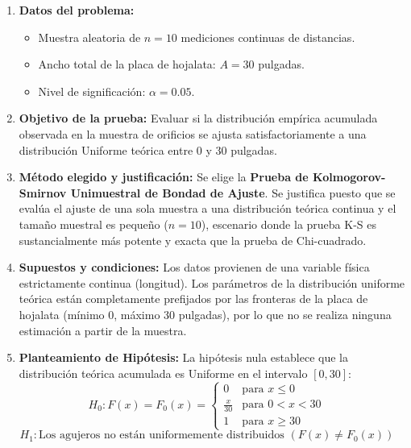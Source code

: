 \documentclass[11pt,a4paper]{article}
\begin{document}
\begin{enumerate}
    \item \textbf{Datos del problema:}
    \begin{itemize}
        \item Muestra aleatoria de $n = 10$ mediciones continuas de distancias.
        \item Ancho total de la placa de hojalata: $A = 30$ pulgadas.
        \item Nivel de significación: $\alpha = 0.05$.
    \end{itemize}

    \item \textbf{Objetivo de la prueba:}
    Evaluar si la distribución empírica acumulada observada en la muestra de orificios se ajusta satisfactoriamente a una distribución Uniforme teórica entre 0 y 30 pulgadas.

    \item \textbf{Método elegido y justificación:}
    Se elige la \textbf{Prueba de Kolmogorov-Smirnov Unimuestral de Bondad de Ajuste}. Se justifica puesto que se evalúa el ajuste de una sola muestra a una distribución teórica continua y el tamaño muestral es pequeño ($n=10$), escenario donde la prueba K-S es sustancialmente más potente y exacta que la prueba de Chi-cuadrado.

    \item \textbf{Supuestos y condiciones:}
    Los datos provienen de una variable física estrictamente continua (longitud). Los parámetros de la distribución uniforme teórica están completamente prefijados por las fronteras de la placa de hojalata (mínimo 0, máximo 30 pulgadas), por lo que no se realiza ninguna estimación a partir de la muestra.

    \item \textbf{Planteamiento de Hipótesis:}
    La hipótesis nula establece que la distribución teórica acumulada es Uniforme en el intervalo $[0, 30]$:
    \[ H_0: F(x) = F_0(x) = \begin{cases} 0 & \text{para } x \le 0 \\ \frac{x}{30} & \text{para } 0 < x < 30 \\ 1 & \text{para } x \ge 30 \end{cases} \quad \]
    \[ H_1: \text{Los agujeros no están uniformemente distribuidos } (F(x) \neq F_0(x)) \quad \]


\end{enumerate}
\end{document}
